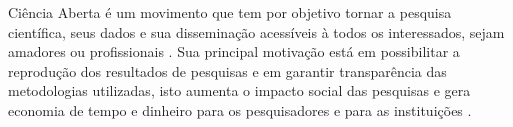 Ciência Aberta é um movimento que tem por objetivo tornar a pesquisa
científica, seus dados e sua disseminação acessíveis à todos os interessados,
sejam amadores ou profissionais \cite{WikipediaOpenScience}. Sua principal
motivação está em possibilitar a reprodução dos resultados de pesquisas e em
garantir transparência das metodologias utilizadas, isto aumenta o impacto
social das pesquisas e gera economia de tempo e dinheiro para os pesquisadores
e para as instituições \cite{Nesta2010}.


%
%
%

